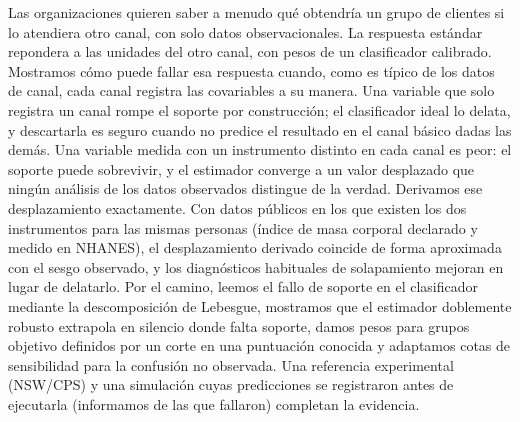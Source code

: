 Las organizaciones quieren saber a menudo qué obtendría un grupo de clientes si lo atendiera otro canal, con solo datos observacionales. La respuesta estándar repondera a las unidades del otro canal, con pesos de un clasificador calibrado. Mostramos cómo puede fallar esa respuesta cuando, como es típico de los datos de canal, cada canal registra las covariables a su manera. Una variable que solo registra un canal rompe el soporte por construcción; el clasificador ideal lo delata, y descartarla es seguro cuando no predice el resultado en el canal básico dadas las demás. Una variable medida con un instrumento distinto en cada canal es peor: el soporte puede sobrevivir, y el estimador converge a un valor desplazado que ningún análisis de los datos observados distingue de la verdad. Derivamos ese desplazamiento exactamente. Con datos públicos en los que existen los dos instrumentos para las mismas personas (índice de masa corporal declarado y medido en NHANES), el desplazamiento derivado coincide de forma aproximada con el sesgo observado, y los diagnósticos habituales de solapamiento mejoran en lugar de delatarlo. Por el camino, leemos el fallo de soporte en el clasificador mediante la descomposición de Lebesgue, mostramos que el estimador doblemente robusto extrapola en silencio donde falta soporte, damos pesos para grupos objetivo definidos por un corte en una puntuación conocida y adaptamos cotas de sensibilidad para la confusión no observada. Una referencia experimental (NSW/CPS) y una simulación cuyas predicciones se registraron antes de ejecutarla (informamos de las que fallaron) completan la evidencia.
